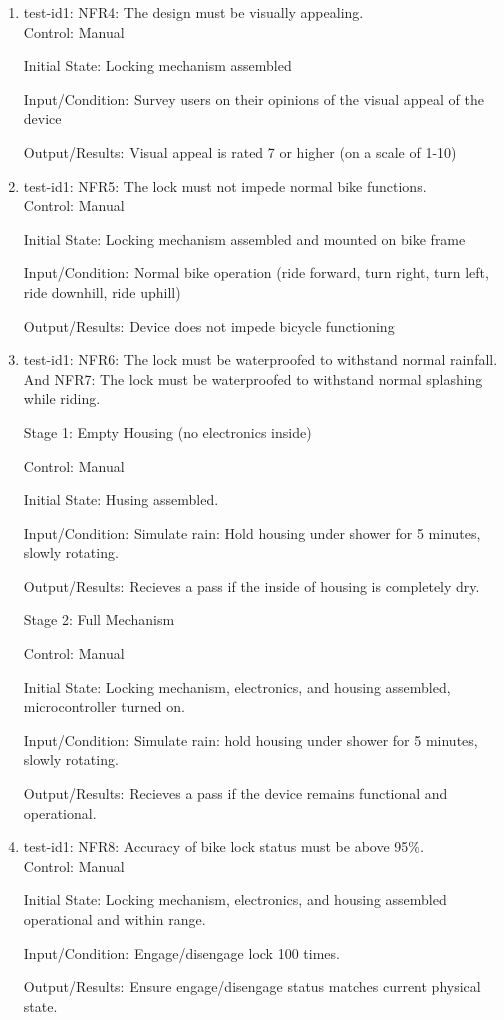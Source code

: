 \documentclass[12pt, titlepage]{article}
\begin{document}
\begin{enumerate}
\item{test-id1: NFR4: The design must be visually appealing. \\}
Control: Manual 

Initial State: Locking mechanism assembled 

Input/Condition: Survey users on their opinions of the visual appeal of the device 

Output/Results: Visual appeal is rated 7 or higher (on a scale of 1-10) 

\item{test-id1: NFR5: The lock must not impede normal bike functions. \\}
Control: Manual 

Initial State: Locking mechanism assembled and mounted on bike frame 

Input/Condition: Normal bike operation (ride forward, turn right, turn left, ride downhill, ride uphill) 

Output/Results: Device does not impede bicycle functioning 

\item{test-id1: NFR6: The lock must be waterproofed to withstand normal rainfall. And NFR7:  The lock must be waterproofed to withstand normal splashing while riding. \\}

Stage 1: Empty Housing (no electronics inside) 

Control: Manual 

Initial State: Husing assembled.

Input/Condition: Simulate rain: Hold housing under shower for 5 minutes, slowly rotating.

Output/Results: Recieves a pass if the inside of housing is completely dry.

Stage 2: Full Mechanism 

Control: Manual 

Initial State: Locking mechanism, electronics, and housing assembled, microcontroller turned on.

Input/Condition: Simulate rain: hold housing under shower for 5 minutes, slowly rotating.

Output/Results: Recieves a pass if the device remains functional and operational.

\item{test-id1: NFR8: Accuracy of bike lock status must be above 95\%. \\}
Control: Manual 

Initial State: Locking mechanism, electronics, and housing assembled operational and within range.

Input/Condition: Engage/disengage lock 100 times. 

Output/Results: Ensure engage/disengage status matches current physical state.
\end{enumerate}
\end{document}
